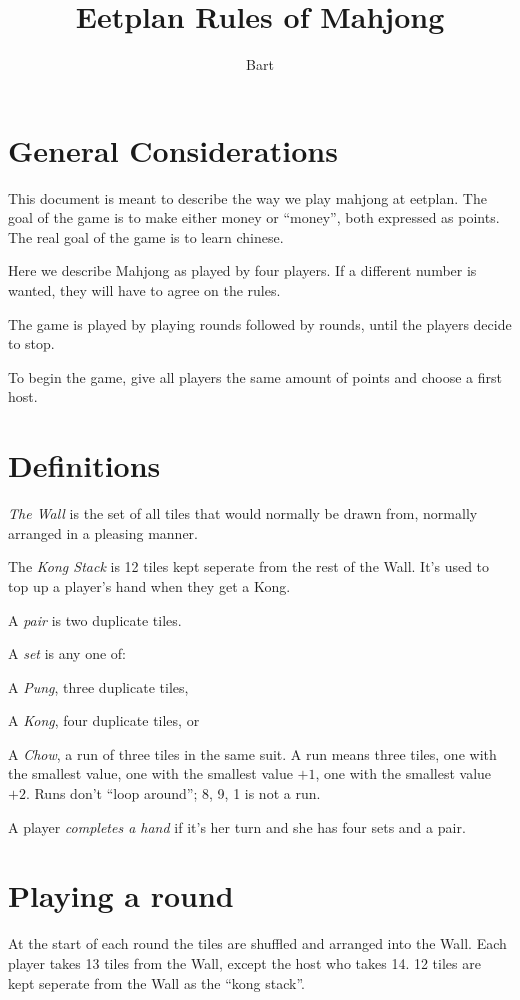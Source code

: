 \documentclass{article}
\begin{document}
\title{Eetplan Rules of Mahjong}
\author{Bart}
\maketitle

\section{General Considerations}
This document is meant to describe the way we play mahjong at eetplan. The goal of the game is to make either money or ``money'', both expressed as points. The real goal of the game is to learn chinese.

Here we describe Mahjong as played by four players. If a different number is wanted, they will have to agree on the rules.

The game is played by playing rounds followed by rounds, until the players decide to stop.

To begin the game, give all players the same amount of points and choose a first host.

\section{Definitions}
\emph{The Wall} is the set of all tiles that would normally be drawn from, normally arranged in a pleasing manner.

The \emph{Kong Stack} is 12 tiles kept seperate from the rest of the Wall. It's used to top up a player's hand when they get a Kong.

A \emph{pair} is two duplicate tiles.

A \emph{set} is any one of:
\begin{enumerate*}
    \item A \emph{Pung}, three duplicate tiles,
    \item A \emph{Kong}, four duplicate tiles, or
    \item A \emph{Chow}, a run of three tiles in the same suit. A run means three tiles, one with the smallest value, one with the smallest value $+1$, one with the smallest value $+2$. Runs don't ``loop around''; 8, 9, 1 is not a run.
\end{enumerate*}

A player \emph{completes a hand} if it's her turn and she has four sets and a pair.

\section{Playing a round}
At the start of each round the tiles are shuffled and arranged into the Wall. Each player takes 13 tiles from the Wall, except the host who takes 14. 12 tiles are kept seperate from the Wall as the ``kong stack''.
\end{document}
